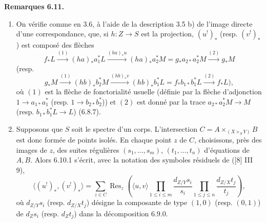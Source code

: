 \documentclass[11pt]{article}
\newenvironment{statement}[1]{\par\medskip\noindent\textbf{#1.}\ }{\par\medskip}
\providecommand{\Res}{\operatorname{Res}}
\begin{document}
\begin{statement}{Remarques 6.11}
\begin{enumerate}[label=\alph*)]
\item On vérifie comme en 3.6, à l'aide de la description 3.5 b) de l'image directe d'une correspondance, que, si $h:Z\to S$ est la projection, $(u^!)_*$ (resp. $(v^!)_*$) est composé des flèches
\[
f_*L\xrightarrow{(1)}(ha)_*a_1^*L\xrightarrow{(ha)_*u}(ha)_*a_2^*M=g_*a_{2*}a_2^*M\xrightarrow{(2)}g_*M
\]
(resp.
\[
g_*M\xrightarrow{(1)}(hb)_*b_2^*M\xrightarrow{(hb)_*v}(hb)_*b_1^*L=f_*b_{1*}b_1^*L\xrightarrow{(2)}f_*L),
\]
où $(1)$ est la flèche de fonctorialité usuelle (définie par la flèche d'adjonction $1\to a_{1*}a_1^*$ (resp. $1\to b_{2*}b_2^*$)) et $(2)$ est donné par la trace $a_{2*}a_2^*M\to M$ (resp. $b_{1*}b_1^*L\to L$) (6.8.7).

\item Supposons que $S$ soit le spectre d'un corps. L'intersection $C=A\times_{(X\times_SY)}B$ est donc formée de points isolés. En chaque point $z$ de $C$, choisissons, près des images de $z$, des suites régulières $(s_1,\ldots,s_m)$, $(t_1,\ldots,t_n)$ d'équations de $A,B$. Alors 6.10.1 s'écrit, avec la notation des symboles résiduels de ([8] III 9),
\begin{equation}
\tag{6.11.1}
\langle (u^!)_*,(v^!)_*\rangle=
\sum_{z\in C}\Res_z\left(\langle u,v\rangle
\prod_{1\le i\le m}\frac{d_{Z/Y}s_i}{s_i}
\prod_{1\le j\le n}\frac{d_{Z/X}t_j}{t_j}\right),
\end{equation}
où $d_{Z/Y}s_i$ (resp. $d_{Z/X}t_j$) désigne la composante de type $(1,0)$ (resp. $(0,1)$) de $d_Zs_i$ (resp. $d_Zt_j$) dans la décomposition 6.9.0.
\end{enumerate}
\end{statement}
\end{document}
